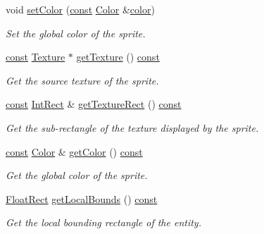\begin{DoxyCompactItemize}
void \hyperlink{classsf_1_1_sprite_a14def44da6437bfea20c4df5e71aba4c}{set\-Color} (\hyperlink{term__entry_8h_a57bd63ce7f9a353488880e3de6692d5a}{const} \hyperlink{classsf_1_1_color}{Color} \&\hyperlink{_entity_8cpp_a864889304a90873adb9c6e289a54bcf4}{color})
\begin{DoxyCompactList}\small\item\em Set the global color of the sprite. \end{DoxyCompactList}\item 
\hyperlink{term__entry_8h_a57bd63ce7f9a353488880e3de6692d5a}{const} \hyperlink{classsf_1_1_texture}{Texture} $\ast$ \hyperlink{classsf_1_1_sprite_a2c4fbb983b29e14f9bb69a3a75feae46}{get\-Texture} () \hyperlink{term__entry_8h_a57bd63ce7f9a353488880e3de6692d5a}{const} 
\begin{DoxyCompactList}\small\item\em Get the source texture of the sprite. \end{DoxyCompactList}\item 
\hyperlink{term__entry_8h_a57bd63ce7f9a353488880e3de6692d5a}{const} \hyperlink{namespacesf_a1b1279ab06950b96686cffaacb72fed5}{Int\-Rect} \& \hyperlink{classsf_1_1_sprite_a89aa58bc39e2072c6afe7c547d27b5a0}{get\-Texture\-Rect} () \hyperlink{term__entry_8h_a57bd63ce7f9a353488880e3de6692d5a}{const} 
\begin{DoxyCompactList}\small\item\em Get the sub-\/rectangle of the texture displayed by the sprite. \end{DoxyCompactList}\item 
\hyperlink{term__entry_8h_a57bd63ce7f9a353488880e3de6692d5a}{const} \hyperlink{classsf_1_1_color}{Color} \& \hyperlink{classsf_1_1_sprite_ab05fafd4e9999608a5cae4985e7b52df}{get\-Color} () \hyperlink{term__entry_8h_a57bd63ce7f9a353488880e3de6692d5a}{const} 
\begin{DoxyCompactList}\small\item\em Get the global color of the sprite. \end{DoxyCompactList}\item 
\hyperlink{namespacesf_ab0d978f5903922a6bdfca1736b71ccc9}{Float\-Rect} \hyperlink{classsf_1_1_sprite_a69557a8369bc2e26dd2e2eb2c50f5c90}{get\-Local\-Bounds} () \hyperlink{term__entry_8h_a57bd63ce7f9a353488880e3de6692d5a}{const} 
\begin{DoxyCompactList}\small\item\em Get the local bounding rectangle of the entity. \end{DoxyCompactList}\item 

\end{DoxyCompactItemize}
